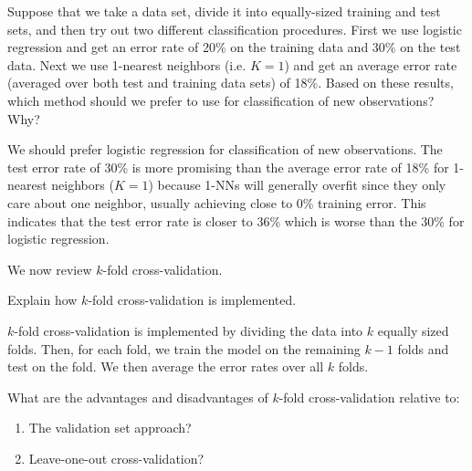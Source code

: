 \documentclass{article}
\begin{document}
\begin{probset}
\begin{prob}
    Suppose that we take a data set, divide it into equally-sized training and test sets, and then try out two different classification procedures. First we use logistic regression and get an error rate of 20\% on the training data and 30\% on the test data. Next we use 1-nearest neighbors (i.e. $K = 1$) and get an average error rate (averaged over both test and training data sets) of 18\%. Based on these results, which method should we prefer to use for classification of new observations? Why?

    \begin{soln}
        We should prefer logistic regression for classification of new observations. The test error rate of 30\% is more promising than the average error rate of 18\% for 1-nearest neighbors ($K = 1$) because 1-NNs will generally overfit since they only care about one neighbor, usually achieving close to 0\% training error. This indicates that the test error rate is closer to 36\% which is worse than the 30\% for logistic regression.
    \end{soln}
\end{prob}

\newpage

\begin{prob}
    We now review $k$-fold cross-validation.

    \begin{subprobset}
    \begin{subprob}
        Explain how $k$-fold cross-validation is implemented.

        \begin{soln}
            $k$-fold cross-validation is implemented by dividing the data into $k$ equally sized folds. Then, for each fold, we train the model on the remaining $k-1$ folds and test on the fold. We then average the error rates over all $k$ folds.
        \end{soln}
    \end{subprob}
    
    \begin{subprob}
        What are the advantages and disadvantages of $k$-fold cross-validation relative to:

        \begin{enumerate}[label=\roman*.]
            \item The validation set approach?
            \item Leave-one-out cross-validation?
        \end{enumerate}


\end{subprob}
\end{subprobset}
\end{prob}
\end{probset}
\end{document}
